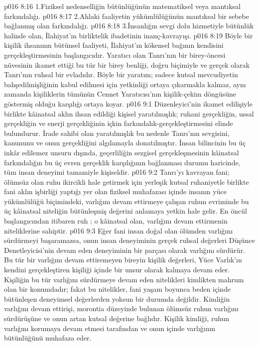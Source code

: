 \vs p016 8:16 1.\bibnobreakspace Fiziksel nedenselliğin bütünlüğünün matematiksel veya mantıksal farkındalığı.
\vs p016 8:17 2.\bibnobreakspace Ahlaki faaliyetin yükümlülüğünün mantıksal bir sebebe bağlanmış olan farkındalığı.
\vs p016 8:18 3.\bibnobreakspace İnsanlığın sevgi dolu hizmetiyle bütünlük halinde olan, İlahiyat’ın birliktelik ibadetinin inanç\hyp{}kavrayışı.
\vs p016 8:19 Böyle bir kişilik ihsanının bütünsel faaliyeti, İlahiyat’ın kökensel bağının kendisini gerçekleştirmesinin başlangıcıdır. Yaratıcı olan Tanrı’nın bir birey\hyp{}öncesi nüvesinin ikamet ettiği bu tür bir birey benliği, doğru biçimiyle ve gerçek olarak Tanrı’nın ruhsal bir evladıdır. Böyle bir yaratım; sadece kutsal mevcudiyetin bahşedilmişliğinin kabul edilmesi için yetkinliği ortaya çıkarmakla kalmaz, aynı zamanda kişiliklerin tümünün Cennet Yaratıcısı’nın kişilik\hyp{}çekim döngüsüne göstermiş olduğu karşılığı ortaya koyar.
\vs p016 9:1 Düzenleyici’nin ikamet edilişiyle birlikte kâinatsal aklın ihsan edildiği kişisel yaratılmışlık; ruhani gerçekliğin, ussal gerçekliğin ve enerji gerçekliğinin içkin farkındalık\hyp{}gerçekleştirmesini elinde bulundurur. İrade sahibi olan yaratılmışlık bu nedenle Tanrı’nın sevgisini, kanununu ve onun gerçekliğini algılamayla donatılmıştır. İnsan bilincinin bu üç inkâr edilemez unsuru dışında, geçerliliğin sezgisel gerçekleşmesinin kâinatsal farkındalığın bu üç evren gerçeklik karşılığının  bağlanması durumu haricinde, tüm insan deneyimi tamamiyle kişiseldir.
\vs p016 9:2 Tanrı’yı kavrayan fani; ölümsüz olan ruhu ikircikli hale getirmek için yerleşik kutsal ruhaniyetle birlikte fani aklın işbirliği yaptığı yer olan fiziksel muhafazası içinde insanın yüce yükümlülüğü biçimindeki, varlığını devam ettirmeye çalışan ruhun evriminde bu üç kâinatsal niteliğin bütünleşmiş değerini anlamaya yetkin hale gelir. En öncül başlangıcından itibaren ruh ; o kâinatsal olan, varlığını devam ettirmenin niteliklerine sahiptir.
\vs p016 9:3 Eğer fani insan doğal olan ölümden varlığını sürdürmeyi başaramazsa, onun insan deneyiminin gerçek ruhsal değerleri Düşünce Denetleyicisi’nin devam eden deneyiminin bir parçası olarak varlığını sürdürür. Bu tür bir varlığını devam ettiremeyen bireyin kişilik değerleri, Yüce Varlık’ın kendini gerçekleştiren kişiliği içinde bir unsur olarak kalmaya devam eder. Kişiliğin bu tür varlığını sürdürmeye devam eden nitelikleri kimlikten mahrum olan bir konumdadır; fakat bu nitelikler, fani yaşam boyunca beden içinde bütünleşen deneyimsel değerlerden yoksun bir durumda değildir. Kimliğin varlığını devam ettirişi, morontia düzeyinde bulunan ölümsüz ruhun varlığını sürdürüşüne ve onun artan kutsal değerine bağlıdır. Kişilik kimliği, ruhun varlığını korumaya devam etmesi tarafından ve onun içinde varlığının bütünlüğünü muhafaza eder.
